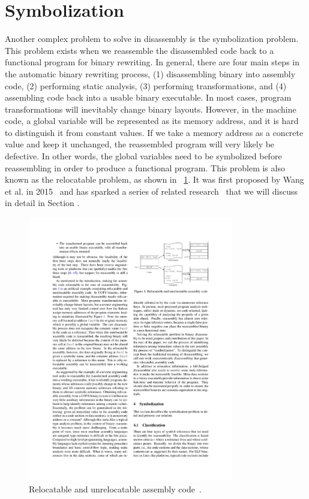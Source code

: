 \section{Symbolization} \label{sec:challenges-symbol}
Another complex problem to solve in disassembly is the symbolization problem. This problem exists when we reassemble the disassembled code back to a functional program for binary rewriting. In general, there are four main steps in the automatic binary rewriting process, (1) disassembling binary into assembly code, (2) performing static analysis, (3) performing transformations, and (4) assembling code back into a usable binary executable.
In most cases, program transformations will inevitably change binary layouts.
However, in the machine code, a global variable will be represented as its memory address, and it is hard to distinguish it from constant values. If we take a memory address as a concrete value and keep it unchanged, the reassembled program will very likely be defective. In other words, the global variables need to be symbolized before reassembling in order to produce a functional program.
This problem is also known as the relocatable problem, as shown in \F~\ref{fig:relocatable}. It was first proposed by Wang et al. in 2015~\cite{wang2015reassembleable} and has sparked a series of related research~\cite{wang2017ramblr,williams2020egalito,dinesh2020retrowrite} that we will discuss in detail in Section .

\begin{figure}[tb]
  \centering
  \includegraphics[width=0.8\textwidth]{fig/relocatable.pdf}
  \caption{Relocatable and unrelocatable assembly code~\cite{wang2015reassembleable}.}
  \label{fig:relocatable}
\end{figure}


